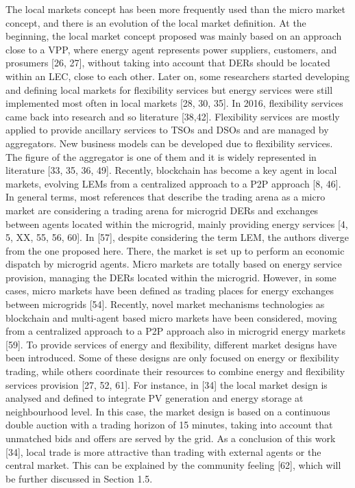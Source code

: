 The local markets concept has been more frequently used than the micro market concept, and there is an evolution of the local market definition. At the beginning, the local market concept proposed was mainly based on an approach close to a VPP, where energy agent represents power suppliers, customers, and prosumers [26, 27], without taking into account that DERs should be located within an LEC, close to each other. Later on, some researchers started developing and defining local markets for flexibility services but energy services were still implemented most often in local markets [28, 30, 35]. In 2016, flexibility services came back into research and
so literature [38,42]. Flexibility services are mostly applied to provide ancillary services to TSOs and DSOs and are managed by aggregators. New business models can be developed due to flexibility services. The figure of the aggregator is one of them and it is widely represented in literature [33, 35, 36, 49]. Recently, blockchain has become a key agent in local markets, evolving LEMs from a centralized approach to a P2P approach [8, 46].
In general terms, most references that describe the trading arena as a micro market are considering a trading arena for microgrid DERs and exchanges between agents located within the microgrid, mainly providing energy services [4, 5, XX, 55, 56, 60]. In [57], despite considering the term LEM, the authors diverge from the one proposed here. There, the market is set up to perform an economic dispatch by microgrid agents. Micro markets are totally based on energy service provision, managing the DERs located within the microgrid. However, in some cases, micro markets have been defined as trading places for energy exchanges between microgrids [54]. Recently, novel market mechanisms technologies as blockchain and multi-agent based micro markets have been considered, moving from a centralized approach to a P2P approach also in microgrid energy markets [59]. To provide services of energy and flexibility, different market designs have been introduced. Some of these designs are only focused on energy or flexibility trading, while others coordinate their resources to combine energy and flexibility services provision [27, 52, 61]. For instance, in [34] the local market design is analysed and defined to integrate PV generation and energy storage at neighbourhood level. In this case, the market design is based on a continuous double auction with a trading horizon of 15 minutes, taking into account that unmatched bids and offers are served by the grid. As a conclusion of this work [34], local trade is more attractive than trading with external agents or the central market. This can be explained by the community feeling [62], which will be further discussed in Section 1.5.

